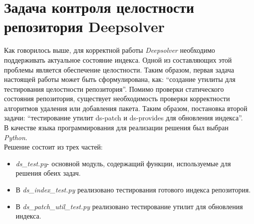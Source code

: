 \section{Задача контроля целостности репозитория Deepsolver}
Как говорилось выше, для корректной работы \textit{Deepsolver} необходимо
поддерживать актуальное состояние индекса. Одной из составляющих
этой проблемы является обеспечение целостности. Таким образом, первая
задача настоящей работы может быть сформулирована, как: ``создание
утилиты для тестирования целостности репозитория''.
Помимо проверки статического состояния репозитория, существует необходимость
проверки корректности алгоритмов удаления или добавления пакета. Таким образом,
постановка второй задачи: ``тестирование утилит ds-patch и ds-provides для обновления
индекса''.\\

В качестве языка программирования для реализации решения был выбран \textit{Python}.\\
Решение состоит из трех частей:\\
\begin{itemize}
\item{ \textit{ds\_test.py}- основной модуль, содержащий функции, используемые
для решения обеих задач.}
\item{ В \textit{ds\_index\_test.py} реализовано тестирования готового индекса репозитория.}
\item{ В \textit{ds\_patch\_util\_test.py} реализовано тестирование утилит для обновления
индекса.}
\end{itemize}

